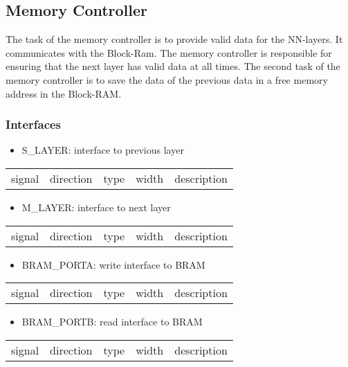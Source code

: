 \subsection{Memory Controller}
The task of the memory controller is to provide valid data for the NN-layers. It communicates with the Block-Ram. The memory controller is responsible for ensuring that the next layer has valid data at all times. The second task of the memory controller is to save the data of the previous data in a free memory address in the Block-RAM. 

\subsubsection{Interfaces}
\begin{itemize}
	\item S\_LAYER: interface to previous layer
\end{itemize}
\begin{tabular}{|l|l|l|l|l|}
	
	signal & direction & type & width & description\\
	
\end{tabular}

\begin{itemize}
	\item M\_LAYER: interface to next layer
\end{itemize}
\begin{tabular}{|l|l|l|l|l|}
	
	signal & direction & type & width & description\\
	
\end{tabular}

\begin{itemize}
	\item BRAM\_PORTA: write interface to BRAM
\end{itemize}
\begin{tabular}{|l|l|l|l|l|}
	
	signal & direction & type & width & description\\
	
\end{tabular}

\begin{itemize}
	\item BRAM\_PORTB: read interface to BRAM
\end{itemize}
\begin{tabular}{|l|l|l|l|l|}
	
	signal & direction & type & width & description\\
	
\end{tabular}

